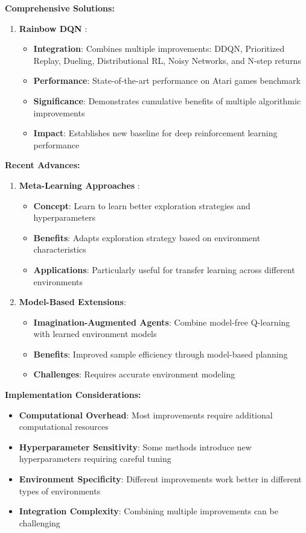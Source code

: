 \documentclass[12pt]{article}
\begin{document}
{{{\textbf{Comprehensive Solutions:}

\begin{enumerate}
    \item \textbf{Rainbow DQN} \cite{hessel2018rainbow}:
    \begin{itemize}
        \item \textbf{Integration}: Combines multiple improvements: DDQN, Prioritized Replay, Dueling, Distributional RL, Noisy Networks, and N-step returns
        \item \textbf{Performance}: State-of-the-art performance on Atari games benchmark
        \item \textbf{Significance}: Demonstrates cumulative benefits of multiple algorithmic improvements
        \item \textbf{Impact}: Establishes new baseline for deep reinforcement learning performance
    \end{itemize}
\end{enumerate}

\textbf{Recent Advances:}

\begin{enumerate}
    \item \textbf{Meta-Learning Approaches} \cite{wang2016learning}:
    \begin{itemize}
        \item \textbf{Concept}: Learn to learn better exploration strategies and hyperparameters
        \item \textbf{Benefits}: Adapts exploration strategy based on environment characteristics
        \item \textbf{Applications}: Particularly useful for transfer learning across different environments
    \end{itemize}
    
    \item \textbf{Model-Based Extensions}:
    \begin{itemize}
        \item \textbf{Imagination-Augmented Agents}: Combine model-free Q-learning with learned environment models
        \item \textbf{Benefits}: Improved sample efficiency through model-based planning
        \item \textbf{Challenges}: Requires accurate environment modeling
    \end{itemize}
\end{enumerate}

\textbf{Implementation Considerations:}
\begin{itemize}
    \item \textbf{Computational Overhead}: Most improvements require additional computational resources
    \item \textbf{Hyperparameter Sensitivity}: Some methods introduce new hyperparameters requiring careful tuning
    \item \textbf{Environment Specificity}: Different improvements work better in different types of environments
    \item \textbf{Integration Complexity}: Combining multiple improvements can be challenging
\end{itemize}

}}}
\end{document}
